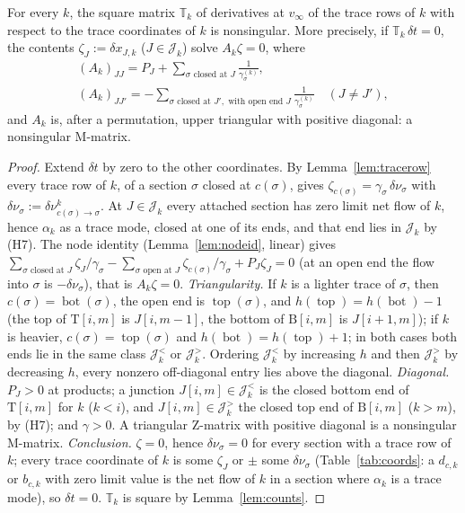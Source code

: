 \documentclass[11pt,a4paper]{report}
\newcommand{\cJ}{\mathcal J}
\newcommand{\Ts}{\mathrm T}
\newcommand{\Bs}{\mathrm B}
\newcommand{\bott}{\operatorname{bot}}
\newcommand{\topp}{\operatorname{top}}
\newcommand{\Tm}{\mathbb T}
\begin{document}
\begin{proposition}\label{prop:traceblock}
For every \(k\), the square matrix \(\Tm_k\) of derivatives at \(v_\infty\) of the trace rows of \(k\) with respect to the trace
coordinates of \(k\) is nonsingular. More precisely, if \(\Tm_k\,\delta t=0\), the contents \(\zeta_J:=\delta x_{J,k}\) (\(J\in\cJ_k\)) solve
\(A_k\zeta=0\), where
\begin{gather*}
(A_k)_{JJ}=P_J+\sum_{\sigma\text{ closed at }J}\frac1{\gamma^{(k)}_\sigma},\\
(A_k)_{JJ'}=-\sum_{\sigma\text{ closed at }J',\text{ with open end }J}\frac1{\gamma^{(k)}_\sigma}\quad(J\ne J'),
\end{gather*}
and \(A_k\) is, after a permutation, upper triangular with positive diagonal: a nonsingular M-matrix.
\end{proposition}
\begin{proof}
Extend \(\delta t\) by zero to the other coordinates. By Lemma~\ref{lem:tracerow} every trace row of \(k\), of a section \(\sigma\) closed at
\(c(\sigma)\), gives \(\zeta_{c(\sigma)}=\gamma_\sigma\,\delta\nu_\sigma\) with \(\delta\nu_\sigma:=\delta\nu^k_{c(\sigma)\to\sigma}\). At \(J\in\cJ_k\) every
attached section has zero limit net flow of \(k\), hence \(\alpha_k\) as a trace mode, closed at one of its ends, and that end lies in \(\cJ_k\)
by (H7). The node identity (Lemma~\ref{lem:nodeid}, linear) gives
\(\sum_{\sigma\text{ closed at }J}\zeta_J/\gamma_\sigma-\sum_{\sigma\text{ open at }J}\zeta_{c(\sigma)}/\gamma_\sigma+P_J\zeta_J=0\) (at an open end the flow
into \(\sigma\) is \(-\delta\nu_\sigma\)), that is \(A_k\zeta=0\).
\emph{Triangularity.} If \(k\) is a lighter trace of \(\sigma\), then \(c(\sigma)=\bott(\sigma)\), the open end is \(\topp(\sigma)\), and
\(h(\topp)=h(\bott)-1\) (the top of \(\Ts[i,m]\) is \(J[i,m-1]\), the bottom of \(\Bs[i,m]\) is \(J[i+1,m]\)); if \(k\) is heavier,
\(c(\sigma)=\topp(\sigma)\) and \(h(\bott)=h(\topp)+1\); in both cases both ends lie in the same class \(\cJ^<_k\) or \(\cJ^>_k\). Ordering \(\cJ^<_k\)
by increasing \(h\) and then \(\cJ^>_k\) by decreasing \(h\), every nonzero off-diagonal entry lies above the diagonal.
\emph{Diagonal.} \(P_J>0\) at products; a junction \(J[i,m]\in\cJ^<_k\) is the closed bottom end of \(\Ts[i,m]\) for \(k\) (\(k<i\)), and
\(J[i,m]\in\cJ^>_k\) the closed top end of \(\Bs[i,m]\) (\(k>m\)), by (H7); and \(\gamma>0\). A triangular Z-matrix with positive diagonal is
a nonsingular M-matrix.
\emph{Conclusion.} \(\zeta=0\), hence \(\delta\nu_\sigma=0\) for every section with a trace row of \(k\); every trace coordinate of \(k\) is
some \(\zeta_J\) or \(\pm\) some \(\delta\nu_\sigma\) (Table~\ref{tab:coords}: a \(d_{c,k}\) or \(b_{c,k}\) with zero limit value is the net flow of
\(k\) in a section where \(\alpha_k\) is a trace mode), so \(\delta t=0\). \(\Tm_k\) is square by Lemma~\ref{lem:counts}.
\end{proof}
\end{document}
